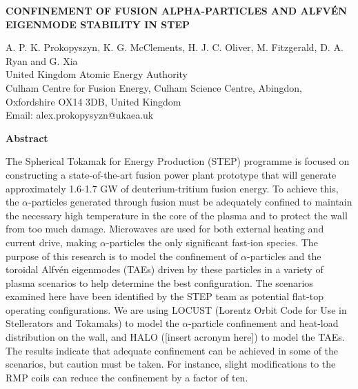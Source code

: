 \documentclass[10pt, a4paper, twoside]{article}
\begin{document}
\begin{flushleft}
\fontsize{12}{14}\selectfont \textbf{CONFINEMENT OF FUSION ALPHA-PARTICLES AND ALFV\'EN EIGENMODE STABILITY IN STEP}

\fontsize{10}{13}\selectfont

A. P. K. Prokopyszyn, K. G. McClements, 
H. J. C. Oliver, M. Fitzgerald, D. A. Ryan and G. Xia \\
United Kingdom Atomic Energy Authority \\
Culham Centre for Fusion Energy, Culham Science Centre, Abingdon, Oxfordshire OX14 3DB, United Kingdom \\
Email: alex.prokopysyzn@ukaea.uk

\end{flushleft}

\begin{flushleft}
\selectfont \textbf{Abstract}
\end{flushleft}

\setlength{\parindent}{1cm}
\fontsize{9}{12pt}\selectfont

The Spherical Tokamak for Energy Production (STEP) programme is focused on constructing a state-of-the-art fusion power plant prototype that will generate approximately 1.6-1.7 GW of deuterium-tritium fusion energy. To achieve this, the $\alpha$-particles generated through fusion must be adequately confined to maintain the necessary high temperature in the core of the plasma and to protect the wall from too much damage. Microwaves are used for both external heating and current drive, making $\alpha$-particles the only significant fast-ion species. The purpose of this research is to model the confinement of $\alpha$-particles and the toroidal Alfvén eigenmodes (TAEs) driven by these particles in a variety of plasma scenarios to help determine the best configuration. The scenarios examined here have been identified by the STEP team as potential flat-top operating configurations. We are using LOCUST (Lorentz Orbit Code for Use in Stellerators and Tokamaks) to model the $\alpha$-particle confinement and heat-load distribution on the wall, and HALO ([insert acronym here]) to model the TAEs. The results indicate that adequate confinement can be achieved in some of the scenarios, but caution must be taken. For instance, slight modifications to the RMP coils can reduce the confinement by a factor of ten.
\end{document}
